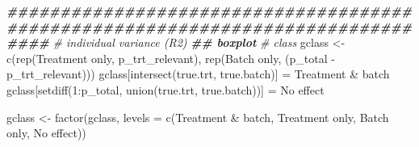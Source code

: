 \documentclass[
]{book}
\newenvironment{Shaded}{\begin{snugshade}}{\end{snugshade}}
\newcommand{\AttributeTok}[1]{\textcolor[rgb]{0.77,0.63,0.00}{#1}}
\newcommand{\CommentTok}[1]{\textcolor[rgb]{0.56,0.35,0.01}{\textit{#1}}}
\newcommand{\DecValTok}[1]{\textcolor[rgb]{0.00,0.00,0.81}{#1}}
\newcommand{\DocumentationTok}[1]{\textcolor[rgb]{0.56,0.35,0.01}{\textbf{\textit{#1}}}}
\newcommand{\FunctionTok}[1]{\textcolor[rgb]{0.00,0.00,0.00}{#1}}
\newcommand{\NormalTok}[1]{#1}
\newcommand{\OtherTok}[1]{\textcolor[rgb]{0.56,0.35,0.01}{#1}}
\newcommand{\SpecialCharTok}[1]{\textcolor[rgb]{0.00,0.00,0.00}{#1}}
\newcommand{\StringTok}[1]{\textcolor[rgb]{0.31,0.60,0.02}{#1}}
\begin{document}
\begin{Shaded}
\begin{Highlighting}[]
\DocumentationTok{\#\#\#\#\#\#\#\#\#\#\#\#\#\#\#\#\#\#\#\#\#\#\#\#\#\#\#\#\#\#\#\#\#\#\#\#\#\#\#\#\#\#\#\#\#\#\#\#\#\#\#\#\#\#\#\#\#\#\#\#\#\#\#\#\#\#\#\#\#\#\#\#\#\#\#\#\#\#\#\#}
\CommentTok{\# individual variance (R2)}
\DocumentationTok{\#\# boxplot}
\CommentTok{\# class}
\NormalTok{gclass }\OtherTok{\textless{}{-}} \FunctionTok{c}\NormalTok{(}\FunctionTok{rep}\NormalTok{(}\StringTok{\textquotesingle{}Treatment only\textquotesingle{}}\NormalTok{, p\_trt\_relevant), }
            \FunctionTok{rep}\NormalTok{(}\StringTok{\textquotesingle{}Batch only\textquotesingle{}}\NormalTok{, (p\_total }\SpecialCharTok{{-}}\NormalTok{ p\_trt\_relevant)))}
\NormalTok{gclass[}\FunctionTok{intersect}\NormalTok{(true.trt, true.batch)] }\OtherTok{=} \StringTok{\textquotesingle{}Treatment \& batch\textquotesingle{}}
\NormalTok{gclass[}\FunctionTok{setdiff}\NormalTok{(}\DecValTok{1}\SpecialCharTok{:}\NormalTok{p\_total, }\FunctionTok{union}\NormalTok{(true.trt, true.batch))] }\OtherTok{=} \StringTok{\textquotesingle{}No effect\textquotesingle{}}

\NormalTok{gclass }\OtherTok{\textless{}{-}} \FunctionTok{factor}\NormalTok{(gclass, }\AttributeTok{levels =} \FunctionTok{c}\NormalTok{(}\StringTok{\textquotesingle{}Treatment \& batch\textquotesingle{}}\NormalTok{, }
                                    \StringTok{\textquotesingle{}Treatment only\textquotesingle{}}\NormalTok{, }
                                    \StringTok{\textquotesingle{}Batch only\textquotesingle{}}\NormalTok{, }
                                    \StringTok{\textquotesingle{}No effect\textquotesingle{}}\NormalTok{))}


\end{Highlighting}
\end{Shaded}
\end{document}

